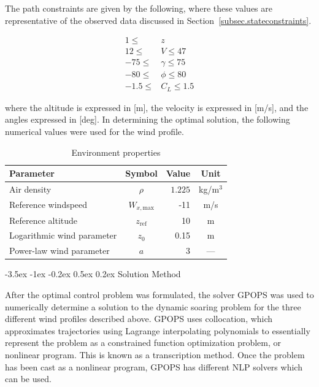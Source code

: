 \documentclass[11pt,letterpaper,onecolumn]{article}
\makeatletter
\renewcommand\subsection{\@startsection{subsection}{1}{\z@}%
{-3.5ex \@plus-1ex \@minus-0.2ex}%
{0.5ex \@plus0.2ex}%
{\fontsize{10pt}{10pt}\selectfont\bfseries\sffamily}}
\makeatother
\begin{document}
  The path constraints are given by the following, where these values are representative of the observed data discussed in Section~\ref{subsec.stateconstraints}.

  \begin{equation*}
    \begin{split}
      1\leq     & z \\
      12\leq    & V\leq47 \\
      -75\leq   & \gamma\leq75 \\
      -80\leq   & \phi\leq80 \\
      -1.5\leq  & C_{L}\leq1.5
    \end{split}
  \end{equation*}

  where the altitude is expressed in [m], the velocity is expressed in [m/s], and the angles expressed in [deg].
  In determining the optimal solution, the following numerical values were used for the wind profile.

  \begin{table}[H]
    \centering
    \caption{Environment properties}
    \begin{tabular}{lcrc}
      \toprule
      Parameter                   & Symbol              & Value   & Unit \\ \midrule
      Air density                 & $\rho$              & $1.225$ & kg/m$^{3}$ \\
      Reference windspeed         & $W_{x,\text{max}}$  & -11     & m/s \\
      Reference altitude          & $z_{\text{ref}}$    & 10      & m \\
      Logarithmic wind parameter  & $z_{0}$             & 0.15    & m \\
      Power-law wind parameter    & $a$                 & 3       & --- \\
      \bottomrule
    \end{tabular}\label{tab.environmentdata}
  \end{table}

  \subsection{Solution Method}

  After the optimal control problem was formulated, the solver GPOPS was used to numerically determine a solution to the dynamic soaring problem for the three different wind profiles described above.
  GPOPS uses collocation, which approximates trajectories using Lagrange interpolating polynomials to essentially represent the problem as a constrained function optimization problem, or nonlinear program.
  This is known as a transcription method.
  Once the problem has been cast as a nonlinear program, GPOPS has different NLP solvers which can be used.
\end{document}
